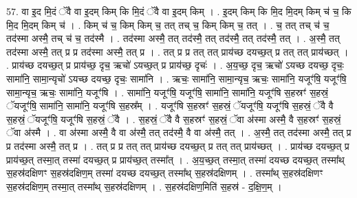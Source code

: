 \documentclass[17pt]{extarticle}
\begin{document}
57. वा इ॒द मि॒दं ॅवै वा इ॒दम् किम् कि मि॒दं ॅवै वा इ॒दम् किम् । . इ॒दम् किम् कि मि॒द मि॒दम् किम् च॑ च॒ कि मि॒द मि॒दम् किम् च॑ । . किम् च॑ च॒ किम् किम् च॒ तत् तच् च॒ किम् किम् च॒ तत् । . च॒ तत् तच् च॑ च॒ तद॑स्मा अस्मै॒ तच् च॑ च॒ तद॑स्मै । . तद॑स्मा अस्मै॒ तत् तद॑स्मै॒ तत् तद॑स्मै॒ तत् तद॑स्मै॒ तत् । . अ॒स्मै॒ तत् तद॑स्मा अस्मै॒ तत् प्र प्र तद॑स्मा अस्मै॒ तत् प्र । . तत् प्र प्र तत् तत् प्राय॑च्छ दयच्छ॒त् प्र तत् तत् प्राय॑च्छत् । . प्राय॑च्छ दयच्छ॒त् प्र प्राय॑च्छ॒ दृच॒ ऋचो॑ ऽयच्छ॒त् प्र प्राय॑च्छ॒ दृचः॑ । . अ॒य॒च्छ॒ दृच॒ ऋचो॑ ऽयच्छ दयच्छ॒ दृचः॒ सामा॑नि॒ सामा॒न्यृचो॑ ऽयच्छ दयच्छ॒ दृचः॒ सामा॑नि । . ऋचः॒ सामा॑नि॒ सामा॒न्यृच॒ ऋचः॒ सामा॑नि॒ यजूꣳ॑षि॒ यजूꣳ॑षि॒ सामा॒न्यृच॒ ऋचः॒ सामा॑नि॒ यजूꣳ॑षि । . सामा॑नि॒ यजूꣳ॑षि॒ यजूꣳ॑षि॒ सामा॑नि॒ सामा॑नि॒ यजूꣳ॑षि स॒हस्रꣳ॑ स॒हस्रं॒ ॅयजूꣳ॑षि॒ सामा॑नि॒ सामा॑नि॒ यजूꣳ॑षि स॒हस्र᳚म् । . यजूꣳ॑षि स॒हस्रꣳ॑ स॒हस्रं॒ ॅयजूꣳ॑षि॒ यजूꣳ॑षि स॒हस्रं॒ ॅवै वै स॒हस्रं॒ ॅयजूꣳ॑षि॒ यजूꣳ॑षि स॒हस्रं॒ ॅवै । . स॒हस्रं॒ ॅवै वै स॒हस्रꣳ॑ स॒हस्रं॒ ॅवा अ॑स्मा अस्मै॒ वै स॒हस्रꣳ॑ स॒हस्रं॒ ॅवा अ॑स्मै । . वा अ॑स्मा अस्मै॒ वै वा अ॑स्मै॒ तत् तद॑स्मै॒ वै वा अ॑स्मै॒ तत् । . अ॒स्मै॒ तत् तद॑स्मा अस्मै॒ तत् प्र प्र तद॑स्मा अस्मै॒ तत् प्र । . तत् प्र प्र तत् तत् प्राय॑च्छ दयच्छ॒त् प्र तत् तत् प्राय॑च्छत् । . प्राय॑च्छ दयच्छ॒त् प्र प्राय॑च्छ॒त् तस्मा॒त् तस्मा॑ दयच्छ॒त् प्र प्राय॑च्छ॒त् तस्मा᳚त् । . अ॒य॒च्छ॒त् तस्मा॒त् तस्मा॑ दयच्छ दयच्छ॒त् तस्मा᳚थ् स॒हस्र॑दक्षिणꣳ स॒हस्र॑दक्षिण॒म् तस्मा॑ दयच्छ दयच्छ॒त् तस्मा᳚थ् स॒हस्र॑दक्षिणम् । . तस्मा᳚थ् स॒हस्र॑दक्षिणꣳ स॒हस्र॑दक्षिण॒म् तस्मा॒त् तस्मा᳚थ् स॒हस्र॑दक्षिणम् । . स॒हस्र॑दक्षिण॒मिति॑ स॒हस्र॑ - द॒क्षि॒ण॒म् । \newline
\pagebreak
{}
\end{document}
